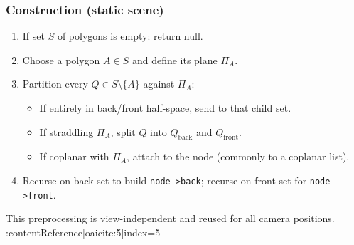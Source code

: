 \documentclass[8pt,twocolumn]{extarticle}
\begin{document}
\subsubsection*{Construction (static scene)}
\begin{enumerate}
  \item If set $S$ of polygons is empty: return null.
  \item Choose a polygon $A\in S$ and define its plane $\Pi_A$.
  \item Partition every $Q\in S\setminus\{A\}$ against $\Pi_A$:
    \begin{itemize}
      \item If entirely in back/front half-space, send to that child set.
      \item If straddling $\Pi_A$, split $Q$ into $Q_\text{back}$ and $Q_\text{front}$.
      \item If coplanar with $\Pi_A$, attach to the node (commonly to a coplanar list).
    \end{itemize}
  \item Recurse on back set to build \texttt{node->back}; recurse on front set for \texttt{node->front}.
\end{enumerate}
This preprocessing is view-independent and reused for all camera positions. :contentReference[oaicite:5]{index=5}
\end{document}
